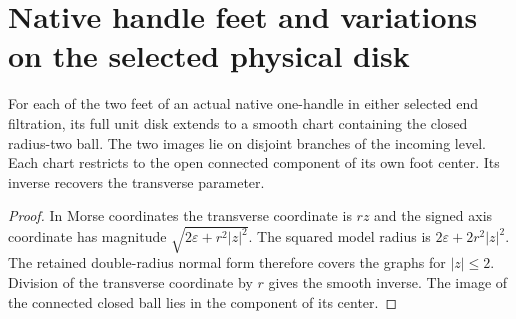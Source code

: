 \section{Native handle feet and variations on the selected physical disk}
\label{sec:ed03-native-feet-jets}

\begin{theorem}
\label{thm:ed03-native-foot-charts}
\leanok
For each of the two feet of an actual native one-handle in either selected
end filtration, its full unit disk extends to a smooth chart containing the
closed radius-two ball. The two images lie on disjoint branches of the
incoming level. Each chart restricts to the open connected component of
its own foot center. Its inverse recovers the transverse parameter.
\end{theorem}
\begin{proof}
\leanok
In Morse coordinates the transverse coordinate is $rz$ and the signed
axis coordinate has magnitude $\sqrt{2\varepsilon+r^2|z|^2}$. The squared
model radius is $2\varepsilon+2r^2|z|^2$. The retained double-radius
normal form therefore covers the graphs for $|z|\le2$. Division of the
transverse coordinate by $r$ gives the smooth inverse. The image of the
connected closed ball lies in the component of its center.
\end{proof}

